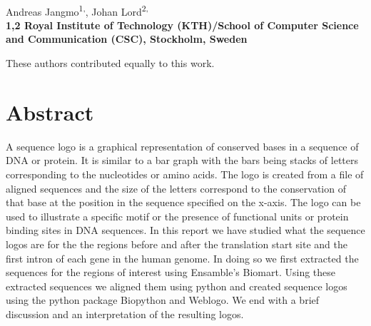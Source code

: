 \documentclass[10pt,letterpaper]{article}
\date{}
\begin{document}
\vspace*{0.35in}

\begin{flushleft}
{\Large
\textbf{}
}
\newline
\\
Andreas Jangmo\textsuperscript{1,\Yinyang},
Johan Lord\textsuperscript{2,\Yinyang}
\\
\bigskip
\bf{1,2} Royal Institute of Technology (KTH)/School of Computer Science and Communication (CSC), Stockholm, Sweden
\bigskip

% 
%
\Yinyang These authors contributed equally to this work.

\end{flushleft}
\section*{Abstract}
A sequence logo is a graphical representation of conserved bases in a sequence of DNA or protein. It is similar to a bar graph with the bars being stacks of letters corresponding to the nucleotides or amino acids. The logo is created from a file of aligned sequences and the size of the letters correspond to the conservation of that base at the position in the sequence specified on the x-axis. The logo can be used to illustrate a specific motif or the presence of functional units or protein binding sites in DNA sequences. In this report we have studied what the sequence logos are for the the regions before and after the translation start site and the first intron of each gene in the human genome. In doing so we first extracted the sequences for the regions of interest using Ensamble's Biomart. Using these extracted sequences we aligned them using python and created sequence logos using the python package Biopython and Weblogo. We end with a brief discussion and an interpretation of the resulting logos.
\end{document}
